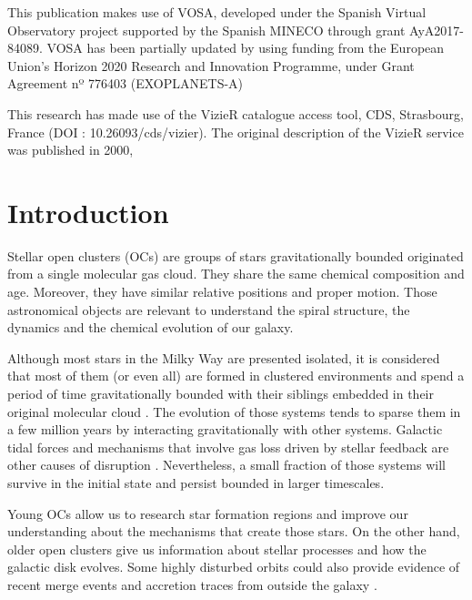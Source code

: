\documentclass[11pt, a4paper, english]{book}
\begin{document}
\medskip

This publication makes use of VOSA, developed under the Spanish Virtual Observatory project
supported by the Spanish MINECO through grant AyA2017-84089.
VOSA has been partially updated by using funding from the European Union's Horizon 2020 Research
and Innovation Programme, under Grant Agreement nº 776403 (EXOPLANETS-A)

\medskip

This research has made use of the VizieR catalogue access tool, CDS, Strasbourg, France (DOI : 10.26093/cds/vizier).
The original description of the VizieR service was published in 2000, \cite[A\&AS 143, 23]{ochsenbein2000vizier}

\mainmatter
\chapter{Introduction}

Stellar open clusters (OCs) \cite{janes1982open} are groups of stars gravitationally bounded originated from a single molecular gas cloud.
They share the same chemical composition and age. Moreover, they have similar relative positions and proper motion.
Those astronomical objects are relevant to understand the spiral structure, the dynamics and the chemical evolution of our galaxy.

Although most stars in the Milky Way are presented isolated, it is considered that most of them (or even all)
are formed in clustered environments and spend a period of time gravitationally bounded with their siblings embedded
in their original molecular cloud \cite{clarke2000theformationofstellarclusters} \cite{portegies2010young}.
The evolution of those systems tends to sparse them in a few million years by interacting gravitationally with other systems.
Galactic tidal forces and mechanisms that involve gas loss driven by stellar feedback are other causes of disruption
\cite{brinkmann2017bound}.
Nevertheless, a small fraction of those systems will survive in the initial state and persist bounded in larger timescales.

Young OCs allow us to research star formation regions and improve our understanding about the mechanisms that create those stars.
On the other hand, older open clusters give us information about stellar processes and how the galactic disk evolves.
Some highly disturbed orbits could also provide evidence of recent merge events and accretion traces from outside the galaxy
\cite{cantat2016abundances}.
\end{document}
